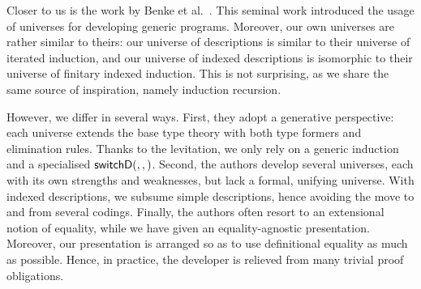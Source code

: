 Closer to us is the work by Benke et
al.~\cite{benke:universe-generic-prog}. This seminal work introduced
the usage of universes for developing generic programs. Moreover, our
own universes are rather similar to theirs: our universe of
descriptions is similar to their universe of iterated induction, and
our universe of indexed descriptions is isomorphic to their universe of
finitary indexed induction. This is not surprising, as we share the
same source of inspiration, namely induction recursion.

However, we differ in several ways. First, they adopt a generative
perspective: each universe extends the base type theory with both type
formers and elimination rules. Thanks to the levitation, we only rely
on a generic induction and a specialised $\switchD{}{}{}$. Second, the
authors develop several universes, each with its own strengths and
weaknesses, but lack a formal, unifying universe. With indexed
descriptions, we subsume simple descriptions, hence avoiding the move
to and from several codings. Finally, the authors often resort to an
extensional notion of equality, while we have given an
equality-agnostic presentation. Moreover, our presentation is arranged
so as to use definitional equality as much as possible. Hence, in
practice, the developer is relieved from many trivial proof
obligations.
